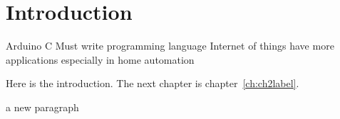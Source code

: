 \chapter{Introduction}\label{ch:introduction}
Arduino C 
Must write programming language
Internet of things have more applications especially in home automation



Here is the introduction. The next chapter is chapter~\ref{ch:ch2label}.


a new paragraph


